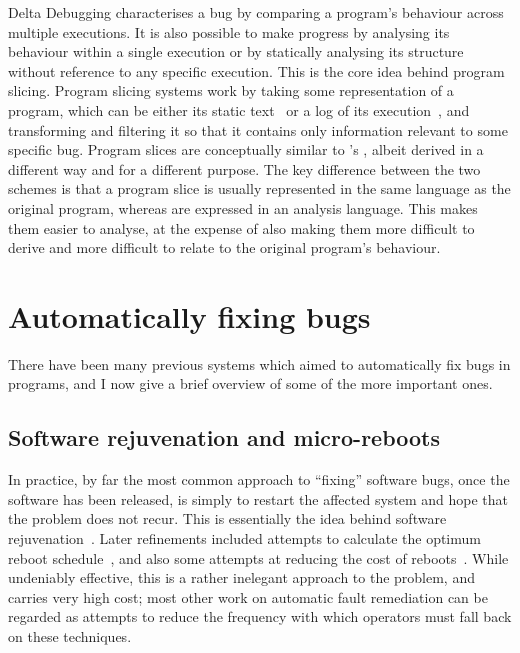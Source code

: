 Delta Debugging characterises a bug by comparing a program's behaviour
across multiple executions.  It is also possible to make progress by
analysing its behaviour within a single execution or by statically
analysing its structure without reference to any specific execution.
This is the core idea behind program slicing.  Program slicing systems
work by taking some representation of a program, which can be either
its static text~\cite{Weiser1981} or a log of its
execution~\cite{Agrawal1990a}, and transforming and filtering it so
that it contains only information relevant to some specific bug.
Program slices are conceptually similar to {\technique}'s
{\StateMachines}, albeit derived in a different way and for a
different purpose.  The key difference between the two schemes is that
a program slice is usually represented in the same language as the
original program, whereas {\StateMachines} are expressed in an
analysis language.  This makes them easier to analyse, at the expense
of also making them more difficult to derive and more difficult to
relate to the original program's behaviour.

\section{Automatically fixing bugs}

There have been many previous systems which aimed to automatically fix
bugs in programs, and I now give a brief overview of some of the more
important ones.

\subsection{Software rejuvenation and micro-reboots}

In practice, by far the most common approach to ``fixing'' software
bugs, once the software has been released, is simply to restart the
affected system and hope that the problem does not recur.  This is
essentially the idea behind software rejuvenation~\cite{Huang1995}.
Later refinements included attempts to calculate the optimum reboot
schedule~\cite{FFFGarg1998,Li2002,Vaidyanathan2001}, and also some
attempts at reducing the cost of
reboots~\cite{Candea2002,Patterson2002}.  While undeniably effective,
this is a rather inelegant approach to the problem, and carries very
high cost; most other work on automatic fault remediation can be
regarded as attempts to reduce the frequency with which operators must
fall back on these techniques.

